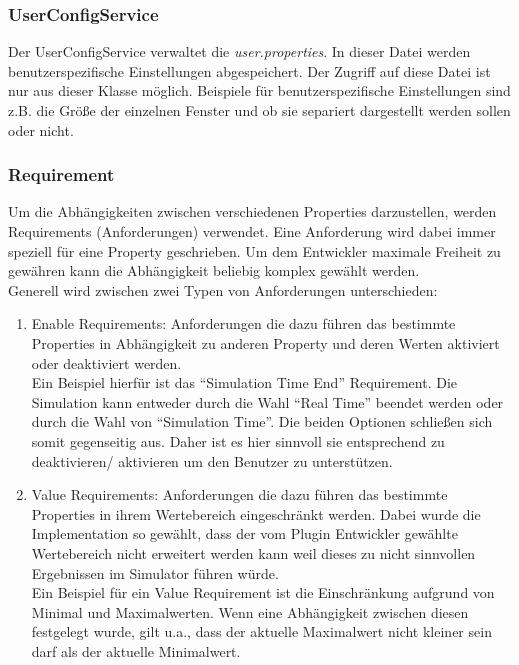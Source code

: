 \documentclass[a4paper, 11pt]{article} %
\begin{document}
\subsubsection{UserConfigService} %
\label{ssub:userconfigservice}
Der UserConfigService verwaltet die \emph{user.properties}. In dieser Datei werden benutzerspezifische Einstellungen abgespeichert. Der Zugriff auf diese Datei ist nur aus dieser Klasse möglich. Beispiele für benutzerspezifische Einstellungen sind z.B. die Größe der einzelnen Fenster und ob sie separiert dargestellt werden sollen oder nicht.

\subsubsection{Requirement} %
\label{ssub:requirement}
Um die Abhängigkeiten zwischen verschiedenen Properties darzustellen, werden Requirements (Anforderungen) verwendet. Eine Anforderung wird dabei immer speziell für eine Property geschrieben. Um dem Entwickler maximale Freiheit zu gewähren kann die Abhängigkeit beliebig komplex gewählt werden.\\

Generell wird zwischen zwei Typen von Anforderungen unterschieden:
\begin{enumerate}
	\item Enable Requirements: Anforderungen die dazu führen das bestimmte Properties in Abhängigkeit zu anderen Property und deren Werten aktiviert oder deaktiviert werden.
	\\

	Ein Beispiel hierfür ist das "`Simulation Time End"' Requirement. Die Simulation kann entweder durch die Wahl "`Real Time"' beendet werden oder durch die Wahl von "`Simulation Time"'. Die beiden Optionen schließen sich somit gegenseitig aus. Daher ist es hier sinnvoll sie entsprechend zu deaktivieren/ aktivieren um den Benutzer zu unterstützen.
	\item Value Requirements: Anforderungen die dazu führen das bestimmte Properties in ihrem Wertebereich eingeschränkt werden. Dabei wurde die Implementation so gewählt, dass der vom Plugin Entwickler gewählte Wertebereich nicht erweitert werden kann weil dieses zu nicht sinnvollen Ergebnissen im Simulator führen würde.\\

	Ein Beispiel für ein Value Requirement ist die Einschränkung aufgrund von Minimal und Maximalwerten. Wenn eine Abhängigkeit zwischen diesen festgelegt wurde, gilt u.a., dass der aktuelle Maximalwert nicht kleiner sein darf als der aktuelle Minimalwert.
\end{enumerate}
\end{document}
